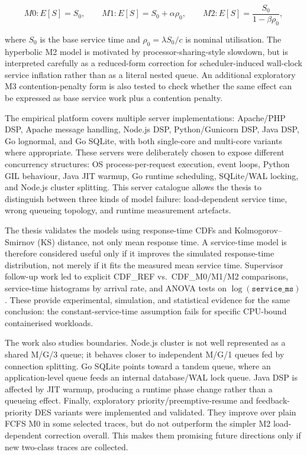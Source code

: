 \[
M0: E[S] = S_0,
\qquad
M1: E[S] = S_0 + \alpha\rho_0,
\qquad
M2: E[S] = \frac{S_0}{1-\beta\rho_0},
\]

where $S_0$ is the base service time and $\rho_0=\lambda S_0/c$ is nominal utilisation. The hyperbolic M2 model is motivated by processor-sharing-style slowdown, but is interpreted carefully as a reduced-form correction for scheduler-induced wall-clock service inflation rather than as a literal nested queue. An additional exploratory M3 contention-penalty form is also tested to check whether the same effect can be expressed as base service work plus a contention penalty.

The empirical platform covers multiple server implementations: Apache/PHP DSP, Apache message handling, Node.js DSP, Python/Gunicorn DSP, Java DSP, Go lognormal, and Go SQLite, with both single-core and multi-core variants where appropriate. These servers were deliberately chosen to expose different concurrency structures: OS process-per-request execution, event loops, Python GIL behaviour, Java JIT warmup, Go runtime scheduling, SQLite/WAL locking, and Node.js cluster splitting. This server catalogue allows the thesis to distinguish between three kinds of model failure: load-dependent service time, wrong queueing topology, and runtime measurement artefacts.

The thesis validates the models using response-time CDFs and Kolmogorov--Smirnov (KS) distance, not only mean response time. A service-time model is therefore considered useful only if it improves the simulated response-time distribution, not merely if it fits the measured mean service time. Supervisor follow-up work led to explicit CDF\_REF vs.\ CDF\_M0/M1/M2 comparisons, service-time histograms by arrival rate, and ANOVA tests on $\log(\texttt{service\_ms})$. These provide experimental, simulation, and statistical evidence for the same conclusion: the constant-service-time assumption fails for specific CPU-bound containerised workloads.

The work also studies boundaries. Node.js cluster is not well represented as a shared M/G/3 queue; it behaves closer to independent M/G/1 queues fed by connection splitting. Go SQLite points toward a tandem queue, where an application-level queue feeds an internal database/WAL lock queue. Java DSP is affected by JIT warmup, producing a runtime phase change rather than a queueing effect. Finally, exploratory priority/preemptive-resume and feedback-priority DES variants were implemented and validated. They improve over plain FCFS M0 in some selected traces, but do not outperform the simpler M2 load-dependent correction overall. This makes them promising future directions only if new two-class traces are collected.

